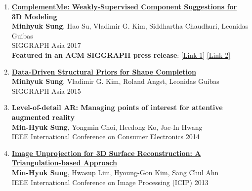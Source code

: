 \documentclass[letterpaper,10pt]{article} %
\newcommand{\blankline}{\quad\pagebreak[2]}
\begin{document}
{\begin{enumerate}
\item \label{siggraphasia17}
\href{https://mhsung.github.io/complement-me.html}{\textbf{ComplementMe: Weakly-Supervised Component Suggestions for 3D Modeling}}\\
\textbf{Minhyuk Sung}, Hao Su, Vladimir G. Kim, Siddhartha Chaudhuri, Leonidas Guibas\\
SIGGRAPH Asia 2017\\
{\color{linkcolor}
\textbf{Featured in an ACM SIGGRAPH press release}:
\href{https://www.eurekalert.org/pub_releases/2017-11/afcm-sad120417.php}{[Link 1]}
\href{https://scienmag.com/simplifying-assembly-based-design-for-3-d-modeling/}{[Link 2]}
}\\
\blankline

\item \label{siggraphasia15}
\href{https://mhsung.github.io/structure-completion.html}{\textbf{Data-Driven Structural Priors for Shape Completion}}\\
\textbf{Minhyuk Sung}, Vladimir G. Kim, Roland Angst, Leonidas Guibas\\
SIGGRAPH Asia 2015\\
\blankline

\item \label{icce14}
\textbf{Level-of-detail AR: Managing points of interest for attentive augmented reality}\\
\textbf{Min-Hyuk Sung}, Yongmin Choi, Heedong Ko, Jae-In Hwang\\
IEEE International Conference on Consumer Electronics 2014\\
\blankline

\item \label{icip13}
\href{http://dx.doi.org/10.1109/icip.2013.6738034}{\textbf{Image Unprojection for 3D Surface Reconstruction: A Triangulation-based Approach}}\\
\textbf{Min-Hyuk Sung}, Hwasup Lim, Hyoung-Gon Kim, Sang Chul Ahn\\
IEEE International Conference on Image Processing (ICIP) 2013\\
\blankline


\end{enumerate}}
\end{document}
